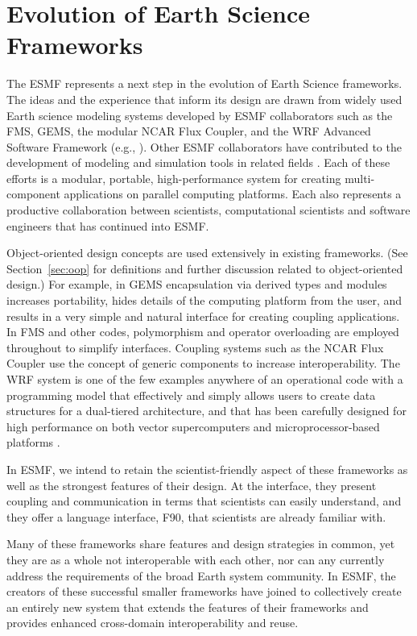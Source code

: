 \section{Evolution of Earth Science Frameworks}
\label{sec:archbackground}

The ESMF represents a next step in the evolution of Earth Science
frameworks.  The ideas and the experience that inform its design
are drawn from widely used Earth science modeling systems 
developed by ESMF collaborators such as the FMS, GEMS, the modular NCAR 
Flux Coupler, and the WRF Advanced Software Framework (e.g., \cite{fms, gems,
wrf, ncarcpl}).  Other ESMF collaborators 
have contributed to the development of modeling and simulation tools in related 
fields \cite{deluca, petsc}.  Each of these efforts is a modular,
portable, high-performance system for creating multi-component applications
on parallel computing platforms.  Each also represents a productive
collaboration between scientists, computational scientists and software
engineers that has continued into ESMF.  

Object-oriented design concepts are used extensively in existing frameworks. 
(See Section~\ref{sec:oop} for definitions and further discussion related to
object-oriented design.)
For example, in GEMS encapsulation 
via derived types and modules increases portability, hides details of the 
computing platform from the user, and results in a very simple and natural
interface for creating coupling applications.  
In FMS and other codes, polymorphism and operator overloading are 
employed throughout to simplify interfaces.  Coupling systems such 
as the NCAR Flux Coupler use the concept of generic components to
increase interoperability.  The WRF system is one of the few 
examples anywhere of an operational code with a programming model 
that effectively and simply allows users to create data structures 
for a dual-tiered architecture, and that has been carefully designed 
for high performance on both vector supercomputers and microprocessor-based 
platforms \cite{wrfperfport}.

In ESMF, we intend to retain the scientist-friendly 
aspect of these frameworks as well as the strongest features of their design.  
At the interface, they present coupling and
communication in terms that scientists can easily understand, and they 
offer a language interface, F90, that scientists are already familiar 
with.  

Many of these frameworks share features and design strategies in common, yet 
they are as a whole not
interoperable with each other, nor can any currently address the requirements
of the broad Earth system community.  In ESMF, the creators of 
these successful smaller frameworks have joined to collectively create an
entirely new system that extends the features of their frameworks and provides 
enhanced cross-domain interoperability and reuse.



